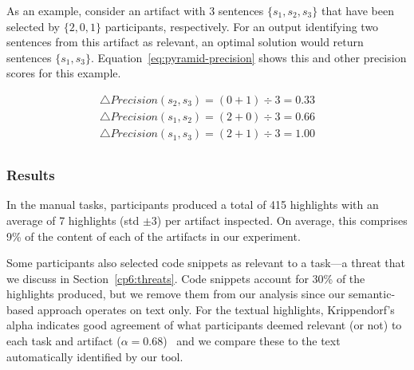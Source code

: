 As an example, consider an artifact with 3 sentences $\{s_1, s_2, s_3\}$ that have been selected by $\{2, 0, 1\}$ participants, respectively.
For an output identifying two sentences from this artifact as relevant, an optimal solution would return sentences $\{s_1, s_3\}$. 
Equation~\ref{eq:pyramid-precision} shows this and other precision scores for this example.



\begin{small}
\begin{equation}
\begin{split}
\triangle  Precision(s_2, s_3) = ( 0 + 1) \div 3 =  0.33 \\
\triangle  Precision(s_1, s_2) = ( 2 + 0) \div 3 =  0.66 \\
\triangle  Precision(s_1, s_3) =  ( 2 + 1) \div 3 =  1.00 \\
\label{eq:pyramid-precision}
\end{split}
\end{equation}
\end{small}





\subsubsection{Results}



In the manual tasks, participants produced a total of 415 highlights with an average of 7 highlights (std $\pm 3$) per artifact inspected.
On average, this comprises 9\% of the content of each of the artifacts in our experiment. 


Some participants also selected code snippets as relevant to a task---a threat that we discuss in Section~\ref{cp6:threats}. 
Code snippets account for 30\% of the highlights produced, but we remove them from our analysis since our semantic-based approach 
operates on text only. For the textual highlights,
Krippendorf's alpha indicates good agreement of what participants deemed relevant (or not) to each task and artifact ($\alpha = 0.68$)~\cite{Krippendorff1980, passonneau2006}
and we compare these to the text automatically identified by our tool.








% 


% 






